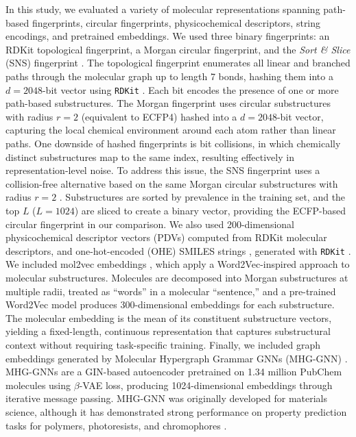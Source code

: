 \documentclass[pdflatex,sn-mathphys-num]{sn-jnl}%
\theoremstyle{thmstyleone}%
\theoremstyle{thmstyletwo}%
\theoremstyle{thmstylethree}%
\begin{document}
In this study, we evaluated a variety of molecular representations spanning path-based fingerprints, circular fingerprints, physicochemical descriptors, string encodings, and pretrained embeddings. We used three binary fingerprints: an RDKit topological fingerprint, a Morgan circular fingerprint, and the \emph{Sort \& Slice} (SNS) fingerprint \citep{Dablander2024}. The topological fingerprint enumerates all linear and branched paths through the molecular graph up to length 7 bonds, hashing them into a $d=2048$-bit vector using \texttt{RDKit} \citep{rdkit}. Each bit encodes the presence of one or more path-based substructures. The Morgan fingerprint uses circular substructures with radius $r=2$ (equivalent to ECFP4) hashed into a $d=2048$-bit vector, capturing the local chemical environment around each atom rather than linear paths. One downside of hashed fingerprints is bit collisions, in which chemically distinct substructures map to the same index, resulting effectively in representation-level noise. To address this issue, the SNS fingerprint uses a collision-free alternative based on the same Morgan circular substructures with radius $r=2$ \citep{Dablander2024}. Substructures are sorted by prevalence in the training set, and the top $L$ ($L=1024$) are sliced to create a binary vector, providing the ECFP-based circular fingerprint in our comparison. We also used 200-dimensional physicochemical descriptor vectors (PDVs) computed from RDKit molecular descriptors, and one-hot-encoded (OHE) SMILES strings \citep{Bertoni2020}, generated with \texttt{RDKit} \citep{rdkit}. We included mol2vec embeddings \citep{jaeger2018mol2vec}, which apply a Word2Vec-inspired approach to molecular substructures. Molecules are decomposed into Morgan substructures at multiple radii, treated as ``words'' in a molecular ``sentence,'' and a pre-trained Word2Vec model produces 300-dimensional embeddings for each substructure. The molecular embedding is the mean of its constituent substructure vectors, yielding a fixed-length, continuous representation that captures substructural context without requiring task-specific training. Finally, we included graph embeddings generated by Molecular Hypergraph Grammar GNNs (MHG-GNN) \citep{kishimoto2023}. MHG-GNNs are a GIN-based autoencoder pretrained on 1.34 million PubChem molecules using $\beta$-VAE loss, producing 1024-dimensional embeddings through iterative message passing. MHG-GNN was originally developed for materials science, although it has demonstrated strong performance on property prediction tasks for polymers, photoresists, and chromophores \citep{kishimoto2023}. 
\end{document}
